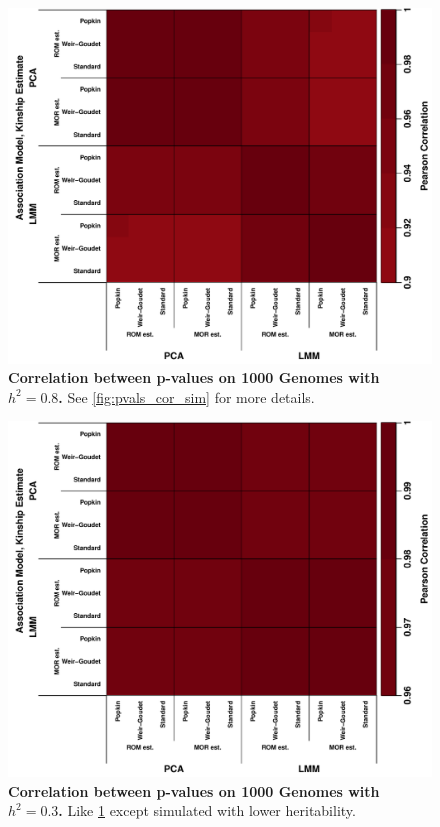 \documentclass[11pt]{article}
\begin{document}
\begin{figure}[bp!]
  \centering
  \includegraphics[width=\textwidth]{tgp-nygc-autosomes_ld_prune_1000kb_0.3_maf-0.01/pvals_cor.pdf}
  \caption{
    {\bf Correlation between p-values on 1000 Genomes with $h^2=0.8$.}
    See \cref{fig:pvals_cor_sim} for more details.
  }
  \label{fig:pvals_cor_real}
\end{figure}

\begin{figure}[bp!]
  \centering
  \includegraphics[width=\textwidth]{tgp-nygc-autosomes_ld_prune_1000kb_0.3_maf-0.01/h-0.3/pvals_cor.pdf}
  \caption{
    {\bf Correlation between p-values on 1000 Genomes with $h^2=0.3$.}
    Like \cref{fig:pvals_cor_real} except simulated with lower heritability.
  }
  \label{fig:pvals_cor_real-h3}
\end{figure}
\end{document}
